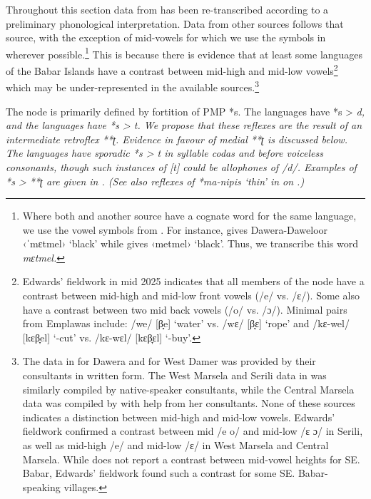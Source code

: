 Throughout this section data from \citet{Taber1993}
has been re-transcribed according to a preliminary
phonological interpretation.
Data from other sources follows that source,
with the exception of mid-vowels
for which we use the symbols in \citet{Taber1993} wherever possible.\footnote{
		Where both \citet{Taber1993} and another source have
		a cognate word for the same language, we use the vowel symbols
		from \citet{Taber1993}. For instance, \citet[418]{Taber1993}
		gives Dawera-Daweloor ‹ˈmɛtmel› `black' while \citet[165]{Chlenova2002}
		gives ‹metmel› `black'. Thus, we transcribe this word \it{mɛtmel}.}
This is because there is evidence that at least some languages
of the Babar Islands have a contrast between mid-high and mid-low
vowels\footnote{
		Edwards' fieldwork in mid 2025 indicates
		that all members of the  node
		have a contrast between mid-high and mid-low front vowels (/e/ vs. /ɛ/).
		Some also have a contrast between two mid back vowels (/o/ vs. /ɔ/).
		Minimal pairs from Emplawas include: /we/ [β̞e] ‘water’ vs.
		/wɛ/ [β̞ɛ] ‘rope’ %
		and /kɛ-wel/ [kɛβ̞el] ‘-cut’
		vs. /kɛ-wɛl/ [kɛβ̞ɛl] ‘-buy’.}
which may be under-represented in the available sources.\footnote{
		The data in \citet{Chlenova2002} for Dawera and
		\citet{ChlenovChlenova2008b} for West Damer
		was provided by their consultants in written form.
		The West Marsela and Serili data in \citet{vanDijk2021}
		was similarly compiled by native-speaker consultants,
		while the Central Marsela data was compiled by \citeauthor{vanDijk2021}
		with help from her consultants.
		None of these sources indicates a distinction
		between mid-high and mid-low vowels.
		Edwards' fieldwork confirmed a contrast
		between mid /e o/ and mid-low /ɛ ɔ/ in Serili,
		as well as mid-high /e/ and mid-low /ɛ/
		in West Marsela and Central Marsela.
		While \citet{Steinhauer2009} does not report a contrast
		between mid-vowel heights for SE. Babar,
		Edwards' fieldwork found such a contrast
		for some SE. Babar-speaking villages.}

The  node is primarily defined by fortition of PMP *s.
The  languages have *s > \it{d},
and the  languages have *s > \it{t}.
We propose that these reflexes are the result of an intermediate retroflex **ʈ.
Evidence in favour of medial **ʈ is discussed below.
The  languages have sporadic *s > \it{t}
in syllable codas and before voiceless consonants,
though such instances of [t] could be allophones of /d/.
Examples of *s > **ʈ are given in .
(See also reflexes of *ma-nipis ‘thin’ in  on .)

